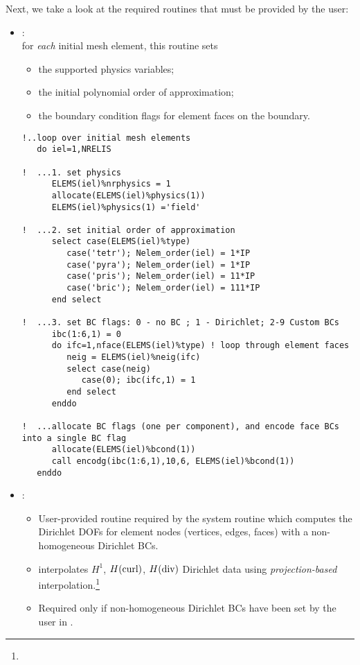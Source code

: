 Next, we take a look at the required routines that must be provided by the user:
\begin{itemize}
	\itemsep 0pt
	\item
	{:\\
	for \emph{each} initial mesh element, this routine sets
	\begin{itemize}
		\item the supported physics variables;
		\item the initial polynomial order of approximation;
		\item the boundary condition flags for element faces on the boundary.
	\end{itemize}
\begin{lstlisting}[caption=\file{POISSON/GALERKIN/}\routine{set\_initial\_mesh} routine.]
!..loop over initial mesh elements
   do iel=1,NRELIS

!  ...1. set physics
      ELEMS(iel)%nrphysics = 1
      allocate(ELEMS(iel)%physics(1))
      ELEMS(iel)%physics(1) ='field'

!  ...2. set initial order of approximation
      select case(ELEMS(iel)%type)
         case('tetr'); Nelem_order(iel) = 1*IP
         case('pyra'); Nelem_order(iel) = 1*IP
         case('pris'); Nelem_order(iel) = 11*IP
         case('bric'); Nelem_order(iel) = 111*IP
      end select

!  ...3. set BC flags: 0 - no BC ; 1 - Dirichlet; 2-9 Custom BCs
      ibc(1:6,1) = 0
      do ifc=1,nface(ELEMS(iel)%type) ! loop through element faces
         neig = ELEMS(iel)%neig(ifc)
         select case(neig)
            case(0); ibc(ifc,1) = 1
         end select
      enddo

!  ...allocate BC flags (one per component), and encode face BCs into a single BC flag
      allocate(ELEMS(iel)%bcond(1))
      call encodg(ibc(1:6,1),10,6, ELEMS(iel)%bcond(1))
   enddo
\end{lstlisting}
	}
	\item
	{:
	\begin{itemize}
	\item User-provided routine required by the system routine  which computes the Dirichlet DOFs for element nodes (vertices, edges, faces) with a non-homogeneous Dirichlet BCs. 
	\item {} interpolates $H^1$, $H(\text{curl})$, $H(\text{div})$ Dirichlet data using \emph{projection-based} interpolation.\footnote{}
	\item Required only if non-homogeneous Dirichlet BCs have been set by the user in .
\end{itemize}

}
\end{itemize}
